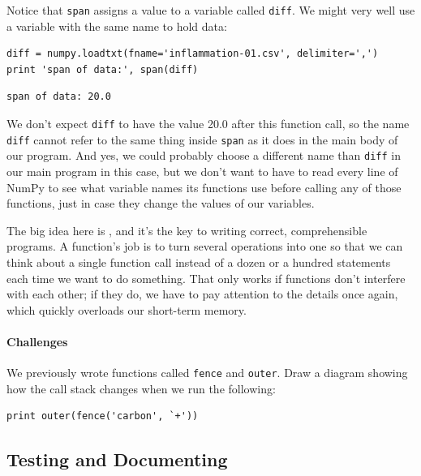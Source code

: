 \documentclass{book}
\begin{document}
Notice that \texttt{span} assigns a value to a variable called
\texttt{diff}. We might very well use a variable with the same name to
hold data:

\begin{verbatim}
diff = numpy.loadtxt(fname='inflammation-01.csv', delimiter=',')
print 'span of data:', span(diff)
\end{verbatim}

\begin{verbatim}
span of data: 20.0
\end{verbatim}

We don't expect \texttt{diff} to have the value 20.0 after this function
call, so the name \texttt{diff} cannot refer to the same thing inside
\texttt{span} as it does in the main body of our program. And yes, we
could probably choose a different name than \texttt{diff} in our main
program in this case, but we don't want to have to read every line of
NumPy to see what variable names its functions use before calling any of
those functions, just in case they change the values of our variables.

The big idea here is , and it's
the key to writing correct, comprehensible programs. A function's job is
to turn several operations into one so that we can think about a single
function call instead of a dozen or a hundred statements each time we
want to do something. That only works if functions don't interfere with
each other; if they do, we have to pay attention to the details once
again, which quickly overloads our short-term memory.

\mbox{}\paragraph{Challenges}

\begin{swcenumerate}
\item
  We previously wrote functions called \texttt{fence} and
  \texttt{outer}. Draw a diagram showing how the call stack changes when
  we run the following:
\begin{verbatim}
print outer(fence('carbon', `+'))
\end{verbatim}
\end{swcenumerate}

\subsection{Testing and Documenting}
\end{document}
